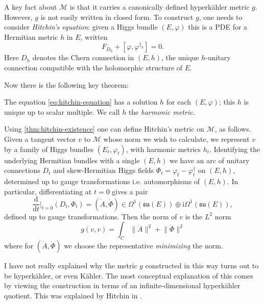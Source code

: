 \documentclass[12pt,letterpaper,reqno]{article}
\numberwithin{equation}{section}
\newcommand{\fsu}{{\mathfrak{su}}}
\newcommand{\cM}{\ensuremath{\mathcal M}}
\newcommand{\kahler}{K\"ahler\xspace}
\newcommand{\hk}{hyperk\"ahler\xspace}
\newcommand{\Hk}{Hyperk\"ahler\xspace}
\newcommand{\I}{{\mathrm i}}
\newcommand{\de}{\mathrm{d}}
\newcommand{\norm}[1]{\lVert#1\rVert}
\newcommand{\ti}[1]{\textit{#1}}
\begin{document}
A key fact about $\cM$ is that it carries a canonically
defined \hk metric $g$. However, $g$ is not easily
written in closed form.
To construct $g$, one needs to consider \ti{Hitchin's equation}:
given a Higgs bundle $(E,\varphi)$ this is a PDE
for a Hermitian metric $h$ in $E$, written
\begin{equation} \label{eq:hitchin-equation}
  F_{D_h} + [\varphi, \varphi^{\dagger_h}] = 0.
\end{equation}
Here $D_h$ denotes the Chern connection in $(E,h)$,
the unique $h$-unitary connection compatible with
the holomorphic structure of $E$.

Now there is the following key theorem:
\begin{thm} \label{thm:hitchin-existence}
The equation \eqref{eq:hitchin-equation} has a solution $h$ for each $(E,\varphi)$;
this $h$ is unique up to scalar multiple.
We call $h$ the \ti{harmonic metric}.
\end{thm}

Using \autoref{thm:hitchin-existence}
one can define Hitchin's metric on $\cM$, as follows.
Given a tangent vector $v$ to $\cM$ whose norm we wish to calculate, we represent $v$ by a family of Higgs bundles
$(E_t,\varphi_t)$, with harmonic metrics $h_t$.
Identifying the underlying Hermitian bundles with a single $(E,h)$
we have an arc of unitary connections $D_t$ and skew-Hermitian 
Higgs fields $\Phi_t = \varphi_t - \varphi_t^\dagger$ 
on $(E,h)$, determined up to gauge transformations i.e. 
automorphisms of $(E,h)$.
In particular, differentiating at $t = 0$ gives a pair
\begin{equation}
\frac{\de}{\de t}\Bigg\rvert_{t=0} (D_t, \Phi_t) = 
(\dot A, \dot \Phi) \in \Omega^1(\fsu(E)) \oplus \I \Omega^{1}(\fsu(E)),
\end{equation}
defined up to gauge transformations.
Then the norm of $v$ is the $L^2$ norm
\begin{equation} \label{eq:l2-metric-def}
  g(v,v) = \int_C \norm{\dot A}^2 + \norm{\dot \Phi}^2
\end{equation}
where for $(\dot A, \dot \Phi)$ we choose the representative
\ti{minimizing} the norm.

\begin{remark}[\Hk quotient] I have not really explained
why the metric $g$ constructed in this way turns out to 
be \hk, or even \kahler. The most conceptual explanation
of this comes by viewing the construction in terms of 
an infinite-dimensional \hk quotient.
This was explained by
Hitchin in \cite{MR89a:32021}.

\end{remark}
\end{document}
